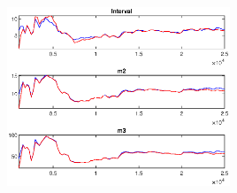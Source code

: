 \documentclass[11pt,preprint, authoryear]{elsarticle}
\let\origfigure\figure
\let\endorigfigure\endfigure
\renewenvironment{figure}[1][2] {
    \expandafter\origfigure\expandafter[H]
} {
    \endorigfigure
}
\numberwithin{equation}{section}
\numberwithin{figure}{section}
\numberwithin{table}{section}
\begin{document}
\begin{figure}
\centering
\includegraphics[width = 0.5\textwidth]{code/mcmc_m}
\caption{MCMC multivariate diagnostics of structural parameters for benchmark sample under the estimated Taylor rule [@brooks1998]. The first plot shows the convergence diagnostics for the 80 per cent interval. The second and third plots shows the estimates of the second and third central moments (m2 and m3), respectively. The red line shows the 80 per cent quantile range based on the 25 0000 pooled draws from all sequences and the blue line shows the mean interval range based on the draws of the individual sequences.}
\label{mcmcm1}
\end{figure}
\end{document}
